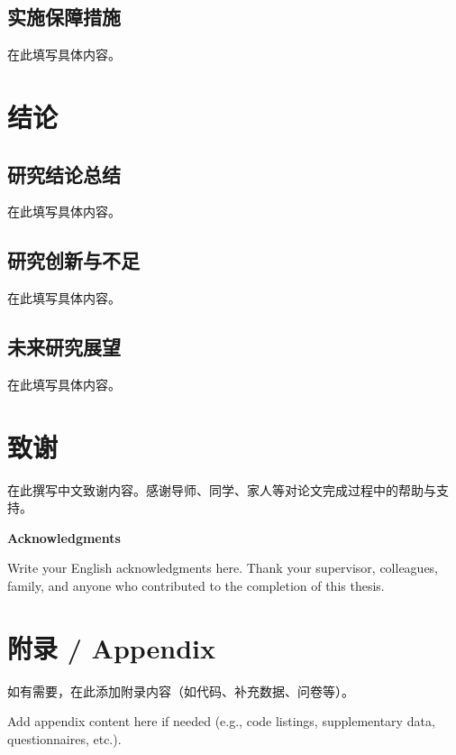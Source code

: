 \documentclass[a4paper,12pt,oneside]{ctexart}
\begin{document}
\subsection{实施保障措施}
在此填写具体内容。


\section{结论}
\subsection{研究结论总结}
在此填写具体内容。

\subsection{研究创新与不足}
在此填写具体内容。

\subsection{未来研究展望}
在此填写具体内容。






\section*{致\quad 谢}

在此撰写中文致谢内容。感谢导师、同学、家人等对论文完成过程中的帮助与支持。

\vspace{1cm}
\begin{center}
{\large \textbf{Acknowledgments}}
\end{center}
\vspace{0.3cm}

Write your English acknowledgments here. Thank your supervisor, colleagues, family, and anyone who contributed to the completion of this thesis.

\appendix
\section{附录 / Appendix}
如有需要，在此添加附录内容（如代码、补充数据、问卷等）。

Add appendix content here if needed (e.g., code listings, supplementary data, questionnaires, etc.).

\end{document}
